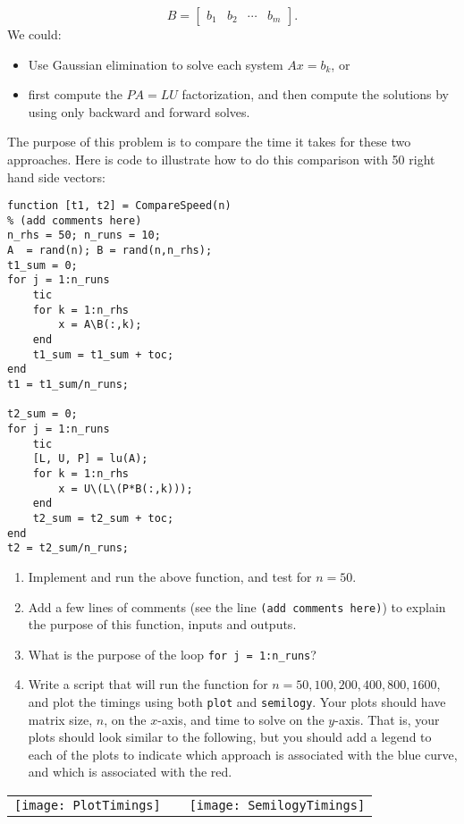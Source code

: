 \documentclass[12pt]{article}
\begin{document}
\begin{enumerate}
$$
B = \left[ \begin{array}{cccc} b_1 & b_2 & \cdots & b_m \end{array} \right].
$$
We could:
\begin{itemize}
\item 
Use Gaussian elimination to solve each system $Ax = b_k$, or 
\item 
first compute the $PA=LU$ factorization, and then compute the solutions by using only backward and forward solves.
\end{itemize}
The purpose of this problem is to compare the time it takes for these two approaches. Here is code to illustrate how to do this comparison with 50 right hand side vectors:
\begin{verbatim}
function [t1, t2] = CompareSpeed(n)
% (add comments here)
n_rhs = 50; n_runs = 10;
A  = rand(n); B = rand(n,n_rhs);
t1_sum = 0;
for j = 1:n_runs
    tic
    for k = 1:n_rhs
        x = A\B(:,k);
    end
    t1_sum = t1_sum + toc;
end
t1 = t1_sum/n_runs;

t2_sum = 0;
for j = 1:n_runs
    tic
    [L, U, P] = lu(A);
    for k = 1:n_rhs
        x = U\(L\(P*B(:,k)));
    end
    t2_sum = t2_sum + toc;
end
t2 = t2_sum/n_runs;
\end{verbatim}
\begin{enumerate}
\item
Implement and run the above function, and test for $n=50$.
\item
Add a few lines of comments (see the line {\tt (add comments here)}) to explain the purpose of this function, inputs and outputs. 
\item
What is the purpose of the loop {\tt for j = 1:n\_runs}?
\item
Write a script that will run the function for $n = 50, 100, 200, 400, 800, 1600$, and plot the timings using both {\tt plot} and {\tt semilogy}. Your plots should have matrix size, $n$, on the $x$-axis, and time to solve on the $y$-axis. That is, your plots should look similar to the following, but you should add a legend to each of the plots to indicate which approach is associated with the blue curve, and which is associated with the red.
\end{enumerate}
\begin{center}
\begin{tabular}{ccc}
\texttt{[image: PlotTimings]} & \hspace*{12pt} &
\texttt{[image: SemilogyTimings]} 
\end{tabular}
\end{center}
\end{enumerate}
\end{document}
